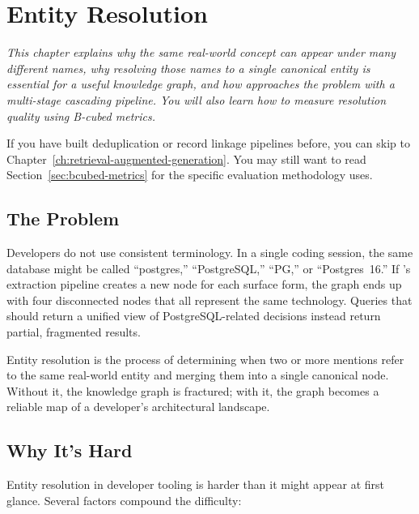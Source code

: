 \chapter{Entity Resolution}
\label{ch:entity-resolution}

\textit{This chapter explains why the same real-world concept can appear under
many different names, why resolving those names to a single canonical entity is
essential for a useful knowledge graph, and how \sysname{} approaches the
problem with a multi-stage cascading pipeline. You will also learn how to
measure resolution quality using B-cubed metrics.}

\begin{skipahead}
If you have built deduplication or record linkage pipelines before, you can
skip to Chapter~\ref{ch:retrieval-augmented-generation}. You may still want to
read Section~\ref{sec:bcubed-metrics} for the specific evaluation methodology
\sysname{} uses.
\end{skipahead}

\section{The Problem}
\label{sec:er-problem}

Developers do not use consistent terminology. In a single coding session, the
same database might be called ``postgres,'' ``PostgreSQL,'' ``PG,'' or
``Postgres~16.'' If \sysname{}'s extraction pipeline creates a new
 node for each surface form, the graph ends up with four
disconnected nodes that all represent the same technology. Queries that should
return a unified view of PostgreSQL-related decisions instead return partial,
fragmented results.

Entity resolution is the process of determining when two or more mentions refer
to the same real-world entity and merging them into a single canonical node.
Without it, the knowledge graph is fractured; with it, the graph becomes a
reliable map of a developer's architectural landscape.

\section{Why It's Hard}
\label{sec:why-hard}

Entity resolution in developer tooling is harder than it might appear at first
glance. Several factors compound the difficulty:

